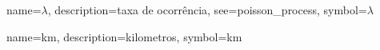 
{
	name={\ensuremath{\lambda}},
	description={taxa de ocorrência},
	see={poisson_process},
	symbol={\ensuremath{\lambda}}
}

{
	name={km},
	description={kilometros},
	symbol={km}
}

